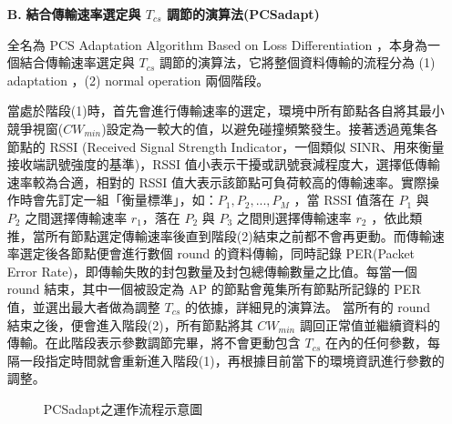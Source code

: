 \documentclass[12pt,a4paper]{article}
\begin{document}
\begin{description}
\begin{enumerate}
\item [\bf B.]{\textbf{\Kai 結合傳輸速率選定與 $T_{cs}$ 調節的演算法(PCSadapt) }}\\
\vspace{-2mm}

全名為 PCS Adaptation Algorithm Based on Loss Differentiation \cite{ton09_optwmn}，本身為一個結合傳輸速率選定與 $T_{cs}$ 調節的演算法，它將整個資料傳輸的流程分為 (1) adaptation ，(2) normal operation 兩個階段。

當處於階段(1)時，首先會進行傳輸速率的選定，環境中所有節點各自將其最小競爭視窗($CW_{min}$)設定為一較大的值，以避免碰撞頻繁發生。接著透過蒐集各節點的 RSSI (Received Signal Strength Indicator，一個類似 SINR、用來衡量接收端訊號強度的基準)，RSSI 值小表示干擾或訊號衰減程度大，選擇低傳輸速率較為合適，相對的 RSSI 值大表示該節點可負荷較高的傳輸速率。實際操作時會先訂定一組「衡量標準」，如：$P_1, P_2, ..., P_M$ ，當 RSSI 值落在 $P_1$ 與 $P_2$ 之間選擇傳輸速率 $r_1$，落在 $P_2$ 與 $P_3$ 之間則選擇傳輸速率 $r_2$ ，依此類推，當所有節點選定傳輸速率後直到階段(2)結束之前都不會再更動。而傳輸速率選定後各節點便會進行數個 round 的資料傳輸，同時記錄 PER(Packet Error Rate)，即傳輸失敗的封包數量及封包總傳輸數量之比值。每當一個 round 結束，其中一個被設定為 AP 的節點會蒐集所有節點所記錄的 PER 值，並選出最大者做為調整 $T_{cs}$ 的依據，詳細見\cite{ton09_optwmn}的演算法。
當所有的 round 結束之後，便會進入階段(2)，所有節點將其 $CW_{min}$ 調回正常值並繼續資料的傳輸。在此階段表示參數調節完畢，將不會更動包含 $T_{cs}$ 在內的任何參數，每隔一段指定時間就會重新進入階段(1)，再根據目前當下的環境資訊進行參數的調整。 

\begin{figure}[hbt] 
\begin{center}
\caption{PCSadapt之運作流程示意圖} \label{fig:PCSadapt}
\vspace{-0.2cm}
\end{center}
\end{figure}




\end{enumerate}
\end{description}
\end{document}
